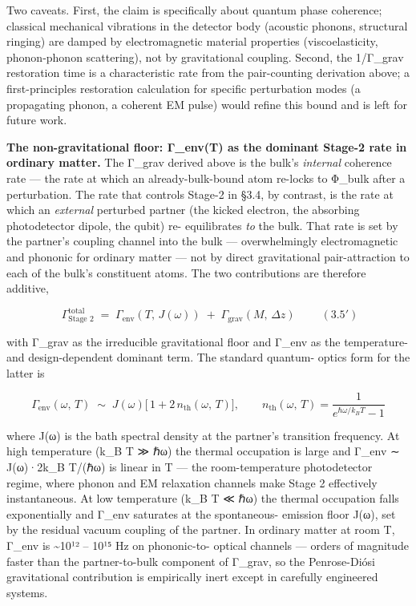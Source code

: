 \documentclass[
]{article}
\begin{document}
Two caveats. First, the claim is specifically about quantum phase
coherence; classical mechanical vibrations in the detector body
(acoustic phonons, structural ringing) are damped by electromagnetic
material properties (viscoelasticity, phonon-phonon scattering), not by
gravitational coupling. Second, the 1/Γ\_grav restoration time is a
characteristic rate from the pair-counting derivation above; a
first-principles restoration calculation for specific perturbation modes
(a propagating phonon, a coherent EM pulse) would refine this bound and
is left for future work.

\textbf{The non-gravitational floor: Γ\_env(T) as the dominant Stage-2
rate in ordinary matter.} The Γ\_grav derived above is the bulk's
\emph{internal} coherence rate --- the rate at which an
already-bulk-bound atom re-locks to Φ\_bulk after a perturbation. The
rate that controls Stage-2 in §3.4, by contrast, is the rate at which an
\emph{external} perturbed partner (the kicked electron, the absorbing
photodetector dipole, the qubit) re- equilibrates \emph{to} the bulk.
That rate is set by the partner's coupling channel into the bulk ---
overwhelmingly electromagnetic and phononic for ordinary matter --- not
by direct gravitational pair-attraction to each of the bulk's
constituent atoms. The two contributions are therefore additive,

\[\boxed{\;\Gamma_{\text{Stage 2}}^{\text{total}} \;=\; \Gamma_{\text{env}}(T,\, J(\omega)) \;+\; \Gamma_{\text{grav}}(M,\,\Delta z)\;} \qquad (3.5')\]

with Γ\_grav as the irreducible gravitational floor and Γ\_env as the
temperature- and design-dependent dominant term. The standard quantum-
optics form for the latter is

\[\Gamma_{\text{env}}(\omega,\, T) \;\sim\; J(\omega)\bigl[\,1 + 2\, n_{\text{th}}(\omega,\, T)\bigr], \qquad n_{\text{th}}(\omega,\, T) = \frac{1}{e^{\hbar\omega/k_B T} - 1}\]

where J(ω) is the bath spectral density at the partner's transition
frequency. At high temperature (k\_B T ≫ ℏω) the thermal occupation is
large and Γ\_env ∼ J(ω)·2k\_B T/(ℏω) is linear in T --- the
room-temperature photodetector regime, where phonon and EM relaxation
channels make Stage 2 effectively instantaneous. At low temperature
(k\_B T ≪ ℏω) the thermal occupation falls exponentially and Γ\_env
saturates at the spontaneous- emission floor J(ω), set by the residual
vacuum coupling of the partner. In ordinary matter at room T, Γ\_env is
\textasciitilde10¹² -- 10¹⁵ Hz on phononic-to- optical channels ---
orders of magnitude faster than the partner-to-bulk component of
Γ\_grav, so the Penrose-Diósi gravitational contribution is empirically
inert except in carefully engineered systems.
\end{document}
